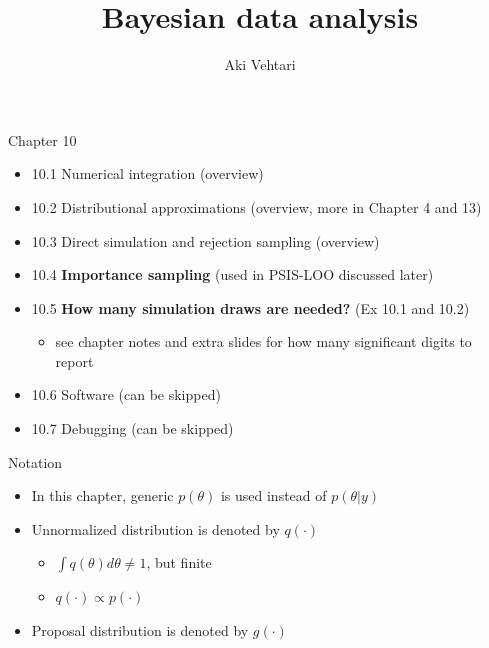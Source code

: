 \documentclass[english,t]{beamer}
\title[]{Bayesian data analysis}
\subtitle{}
\author{Aki Vehtari}
\institute[Aalto]{}
\begin{document}
\begin{frame}{Chapter 10}

  \begin{itemize}
\item 10.1 Numerical integration (overview)
\item 10.2 Distributional approximations (overview, more in Chapter 4 and 13)
\item 10.3 Direct simulation and rejection sampling (overview)
\item 10.4 \textbf{Importance sampling} (used in PSIS-LOO discussed later)
\item 10.5 \textbf{How many simulation draws are needed?} (Ex 10.1 and 10.2)
  \begin{itemize}
  \item see chapter notes and extra slides for how many significant
    digits to report
  \end{itemize}
\item 10.6 Software (can be skipped)
\item 10.7 Debugging (can be skipped)
   \end{itemize}
\end{frame}

\begin{frame}{Notation}

  \begin{itemize}
  \item In this chapter, generic $p(\theta)$ is used instead of
    $p(\theta|y)$
  \item Unnormalized distribution is denoted by $q(\cdot)$
    \begin{itemize}
    \item $\int q(\theta) d\theta \neq 1$, but finite
    \item $q(\cdot) \propto p(\cdot)$
    \end{itemize}
  \item Proposal distribution is denoted by $g(\cdot)$
  \end{itemize}

\end{frame}
\end{document}
